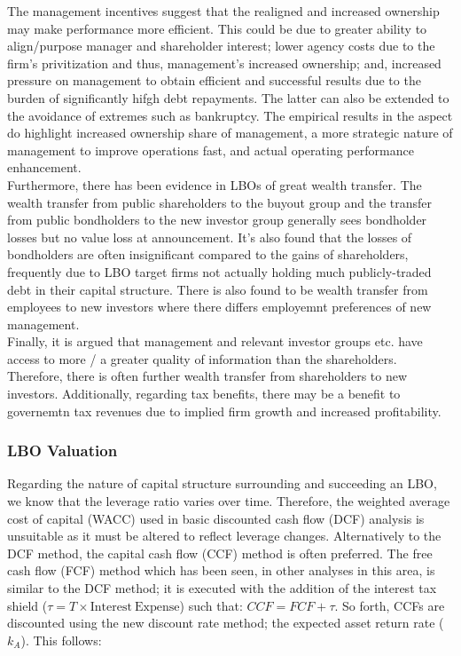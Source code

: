 \documentclass[11pt, english]{article}
\begin{document}
	The management incentives suggest that the realigned and increased ownership may make performance more efficient. This could be due to greater ability to align/purpose manager and shareholder interest; lower agency costs due to the firm's privitization and thus, management's increased ownership; and, increased pressure on management to obtain efficient and successful results due to the burden of significantly hifgh debt repayments. The latter can also be extended to the avoidance of extremes such as bankruptcy. The empirical results in the aspect do highlight increased ownership share of management, a more strategic nature of management to improve operations fast, and actual operating performance enhancement.\\

	Furthermore, there has been evidence in LBOs of great wealth transfer. The wealth transfer from public shareholders to the buyout group and the transfer from public bondholders to the new investor group generally sees bondholder losses but no value loss at announcement. It's also found that the losses of bondholders are often insignificant compared to the gains of shareholders, frequently due to LBO target firms not actually holding much publicly-traded debt in their capital structure. There is also found to be wealth transfer from employees to new investors where there differs employemnt preferences of new management.\\

	Finally, it is argued that management and relevant investor groups etc. have access to more / a greater quality of information than the shareholders. Therefore, there is often further wealth transfer from shareholders to new investors. Additionally, regarding tax benefits, there may be a benefit to governemtn tax revenues due to implied firm growth and increased profitability.

		\subsubsection*{LBO Valuation}

	Regarding the nature of capital structure surrounding and succeeding an LBO, we know that the leverage ratio varies over time. Therefore, the weighted average cost of capital (WACC) used in basic discounted cash flow (DCF) analysis is unsuitable as it must be altered to reflect leverage changes. Alternatively to the DCF method, the capital cash flow (CCF) method is often preferred. The free cash flow (FCF) method which has been seen, in other analyses in this area, is similar to the DCF method; it is executed with the addition of the interest tax shield ($\tau=T\times\mathrm{Interest\ Expense}$) such that: $CCF=FCF+\tau$. So forth, CCFs are discounted using the new discount rate method; the expected asset return rate ($k_A$). This follows:
\end{document}
